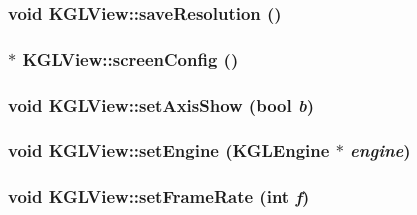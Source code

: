 \hypertarget{class_k_g_l_view_0f69b4842403e72541e2486ea8d289dd}{
\subsubsection[{saveResolution}]{\setlength{\rightskip}{0pt plus 5cm}void KGLView::saveResolution ()}}
\label{class_k_g_l_view_0f69b4842403e72541e2486ea8d289dd}


\hypertarget{class_k_g_l_view_ead550d304e10d08fdaa06416b53d7cf}{
\subsubsection[{screenConfig}]{$\ast$ KGLView::screenConfig ()}}
\label{class_k_g_l_view_ead550d304e10d08fdaa06416b53d7cf}


\hypertarget{class_k_g_l_view_f8263dcf540805c60d724c50e539075f}{
\subsubsection[{setAxisShow}]{\setlength{\rightskip}{0pt plus 5cm}void KGLView::setAxisShow (bool {\em b})}}
\label{class_k_g_l_view_f8263dcf540805c60d724c50e539075f}


\hypertarget{class_k_g_l_view_61cfd521e7544d61d7531b29702f9833}{
\subsubsection[{setEngine}]{\setlength{\rightskip}{0pt plus 5cm}void KGLView::setEngine ({\bf KGLEngine} $\ast$ {\em engine})}}
\label{class_k_g_l_view_61cfd521e7544d61d7531b29702f9833}


\hypertarget{class_k_g_l_view_65ccc66131b6682f5fce7166cb5a4f53}{
\subsubsection[{setFrameRate}]{\setlength{\rightskip}{0pt plus 5cm}void KGLView::setFrameRate (int {\em f})}}
\label{class_k_g_l_view_65ccc66131b6682f5fce7166cb5a4f53}


